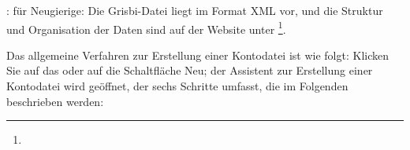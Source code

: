 \Note{}: für Neugierige: Die Grisbi-Datei liegt im Format \gls{XML} vor, und die Struktur und Organisation der Daten sind auf der Website unter \footnote{\urlSourceForgeDocumentationFormat{}}.

Das allgemeine Verfahren zur Erstellung einer Kontodatei ist wie folgt: Klicken Sie auf das  oder auf die Schaltfläche Neu; der Assistent zur Erstellung einer Kontodatei wird geöffnet, der sechs Schritte umfasst, die im Folgenden beschrieben werden:

